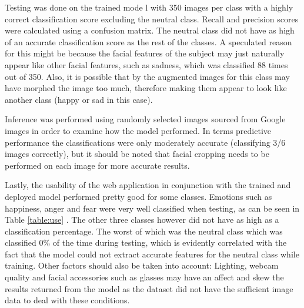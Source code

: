 Testing was done on the trained mode l with 350 images per class with a highly correct classification score excluding the neutral class. Recall and precision scores were calculated using a confusion matrix. The neutral class did not have as high of an accurate classification score as the rest of the classes. A speculated reason for this might be because the facial features of the subject may just naturally appear like other facial features, such as sadness, which was classified 88 times out of 350. Also, it is possible that by the augmented images for this class may have morphed the image too much, therefore making them appear to look like another class (happy or sad in this case).

Inference was performed using randomly selected images sourced from Google images in order to examine how the model performed. In terms predictive performance the classifications were only moderately accurate (classifying 3/6 images correctly), but it should be noted that facial cropping needs to be performed on each image for more accurate results.

Lastly, the usability of the web application in conjunction with the trained and deployed model performed pretty good for some classes. Emotions such as happiness, anger and fear were very well classified when testing, as can be seen in Table \ref{table:use} . The other three classes however did not have as high as a classification percentage. The worst of which was the neutral class which was classified 0\% of the time during testing, which is evidently correlated with the fact that the model could not extract accurate features for the neutral class while training. Other factors should also be taken into account: Lighting, webcam quality and facial accessories such as glasses may have an affect and skew the results returned from the model as the dataset did not have the sufficient image data to deal with these conditions.



